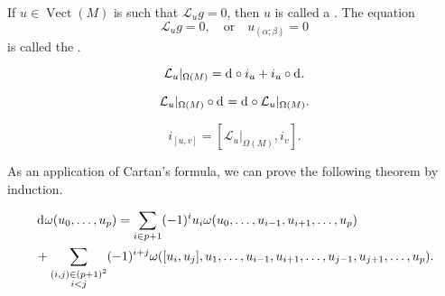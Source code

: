 \documentclass[openany, oneside, a5paper]{book}
\DeclareMathOperator{\Vect}{Vect}
\begin{document}

\begin{definition}
    If $u \in \Vect(M)$ is such that $\mathcal L_u g = 0$, then $u$ is called a . 
    The equation
    \begin{equation}
        \mathcal L_u g = 0,
        \quad \text{or} \quad
        u_{(\alpha;\beta)} = 0
    \end{equation}
    is called the .
\end{definition}

\begin{theorem}
    \begin{equation}
        \mathcal L_u |_{\Omega(M)} = \mathop{}\!\mathrm{d}^{} \circ i_u + i_u \circ \mathop{}\!\mathrm{d}^{}.
    \end{equation}
\end{theorem}

\begin{corollary}
    \begin{equation}
        \mathcal L_u |_{\Omega(M)} \circ \mathop{}\!\mathrm{d}^{} = \mathop{}\!\mathrm{d}^{} \circ \mathcal L_u |_{\Omega(M)}.
    \end{equation}
\end{corollary}

\begin{corollary}
    \begin{equation}
        i_{[u, v]} = [\mathcal L_u |_{\Omega(M)}, i_v].
    \end{equation}
\end{corollary}

As an application of Cartan's formula, we can prove the following theorem by induction.
\begin{theorem}\label{theorem: exterior differential formula}
    {\small
        \begin{align}
        &\mathop{}\!\mathrm{d}^{} \omega(u_0, \ldots, u_p) 
            = \sum_{i \in p + 1} (-1)^i u_i \omega(u_0, \ldots, u_{i-1}, u_{i+1}, \ldots, u_p)
            \\
            &
            + \sum_{\substack{
                (i, j) \in (p + 1)^2
                \\
                i < j
                }} (-1)^ {i + j} \omega([u_i, u_j], u_1, \ldots, u_{i-1}, u_{i+1}, \ldots, u_{j-1}, u_{j+1}, \ldots, u_p).
    \end{align}
    }
\end{theorem}
\end{document}
